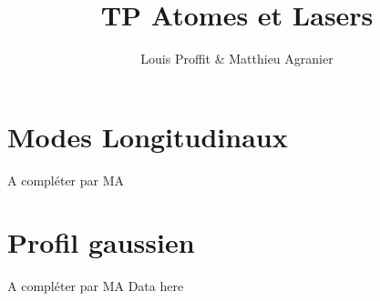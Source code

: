 \documentclass[a4paper,11pt,twoside]{article}
\title{TP Atomes et Lasers}
\author{Louis Proffit \& Matthieu Agranier }
\newcommand{\test}{Data here}
\begin{document}
    \maketitle

    \section{Modes Longitudinaux}\label{sec:modes-longitudinaux}

    A compléter par MA


    \section{Profil gaussien}\label{sec:profil-gaussien}

    A compléter par MA
    \test{}
\end{document}
